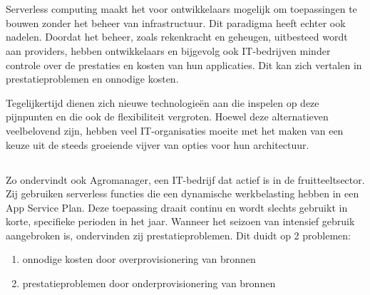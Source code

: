 
\chapter{}%
\label{ch:inleiding}

Serverless computing maakt het voor ontwikkelaars mogelijk om toepassingen te bouwen zonder het beheer van infrastructuur. Dit paradigma heeft echter ook nadelen. Doordat het beheer, zoals rekenkracht en geheugen, uitbesteed wordt aan providers, hebben ontwikkelaars en bijgevolg ook IT-bedrijven minder controle over de prestaties en kosten van hun applicaties. Dit kan zich vertalen in prestatieproblemen en onnodige kosten.

Tegelijkertijd dienen zich nieuwe technologieën aan die inspelen op deze pijnpunten en die ook de flexibiliteit vergroten. Hoewel deze alternatieven veelbelovend zijn, hebben veel IT-organisaties moeite met het maken van een keuze uit de steeds groeiende vijver van opties voor hun architectuur.

\section{}%
\label{sec:probleemstelling}

Zo ondervindt ook Agromanager, een IT-bedrijf dat actief is in de fruitteeltsector. Zij gebruiken serverless functies die een dynamische werkbelasting hebben in een App Service Plan. Deze toepassing draait continu en wordt slechts gebruikt in korte, specifieke perioden in het jaar. Wanneer het seizoen van intensief gebruik aangebroken is, ondervinden zij prestatieproblemen. Dit duidt op 2 problemen: 

\begin{enumerate}
    \item onnodige kosten door overprovisionering van bronnen
    \item prestatieproblemen door onderprovisionering van bronnen
\end{enumerate}

\section{}%
\label{sec:onderzoeksvraag}

